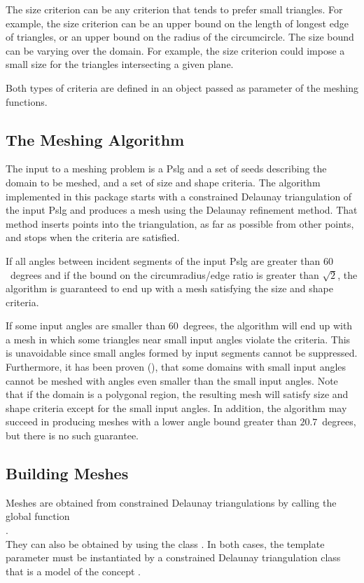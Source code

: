 The size criterion can be any criterion that tends to prefer small
triangles. For example, the size criterion can be an upper bound on the
length of longest edge of triangles, or an upper bound on the radius of the
circumcircle. The size bound can be varying over the domain. For example,
the size criterion could impose a small size for the triangles intersecting
a given plane.

Both types of criteria are defined in an object  passed as
parameter of the meshing functions.

\subsection{The Meshing Algorithm}

The input to a meshing problem is a {\sc Pslg} and a set of seeds
describing the domain to be meshed, and a set of size and shape
criteria.  The algorithm implemented in this package starts with a
constrained Delaunay triangulation of the input {\sc Pslg} and produces a
mesh using the Delaunay refinement method. That method inserts points into
the triangulation, as far as possible from other points, and stops when the
criteria are satisfied.

If all angles between incident segments of the input {\sc Pslg}
are greater than $60$~degrees and if the bound on the
circumradius/edge ratio is greater than $\sqrt{2}$,
the algorithm is guaranteed to end up with a mesh
satisfying the size and shape criteria.

If some input angles are smaller than $60$~degrees, the algorithm will
end up with a mesh in which some triangles near small input angles
violate the criteria.  This is unavoidable since small angles formed
by input segments cannot be suppressed. Furthermore, it has been
proven (\cite{s-mgdsa-00}), that some domains with small input angles
cannot be meshed with angles even smaller than the small input angles.
Note that if the domain is a polygonal region, the resulting mesh will
satisfy size and shape criteria except for the small input angles.
In addition, the algorithm may succeed in producing meshes with a lower
angle bound greater than $20.7$~degrees, but there is no such guarantee.

\subsection{Building Meshes}
\label{sec:Mesh_2_building_meshes}

Meshes are obtained from
constrained Delaunay triangulations by calling the global function \\
. \\
They can also be obtained by using the class .
In both cases, the template parameter  must be instantiated by a
constrained Delaunay triangulation class that is a model of the concept
.

